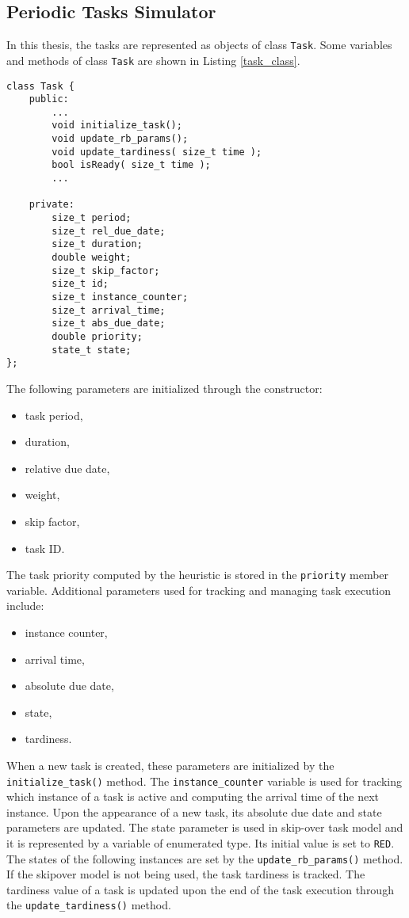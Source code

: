 \subsection{Periodic Tasks Simulator}
In this thesis, the tasks are represented as objects of class \texttt{Task}.
Some variables and methods of class \texttt{Task} are shown in Listing \ref{task_class}.
\newline
\begin{lstlisting}[frame=none, label={task_class}, caption={Variables and methods of class \texttt{Task}.}, captionpos=b]
class Task {
	public:
		...
		void initialize_task();
		void update_rb_params();
		void update_tardiness( size_t time );
		bool isReady( size_t time );
		...

	private:
        size_t period;
        size_t rel_due_date;
        size_t duration;
        double weight;
        size_t skip_factor;
        size_t id;
		size_t instance_counter;
        size_t arrival_time;
        size_t abs_due_date;
        double priority;
        state_t state;
};
\end{lstlisting}
The following parameters are initialized through the constructor:
\begin{itemize}
	\item task period,
	\item duration,
	\item relative due date,
	\item weight,
	\item skip factor,
	\item task ID.
\end{itemize}
The task priority computed by the heuristic is stored in the \texttt{priority} member variable.
Additional parameters used for tracking and managing task execution include:
\begin{itemize}
	\item instance counter,
	\item arrival time,
	\item absolute due date,
	\item state,
	\item tardiness.
\end{itemize}
When a new task is created, these parameters are initialized by the \texttt{initialize\_task()} method.
The \texttt{instance\_counter} variable is used for tracking which instance of a task is active and computing the arrival time of the next instance.
Upon the appearance of a new task, its absolute due date and state parameters are updated.
The state parameter is used in skip-over task model and it is represented by a variable of enumerated type. Its initial value is set to \texttt{RED}.
The states of the following instances are set by the \texttt{update\_rb\_params()} method.
If the skipover model is not being used, the task tardiness is tracked.
The tardiness value of a task is updated upon the end of the task execution through the \texttt{update\_tardiness()} method.

